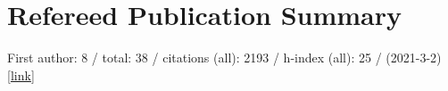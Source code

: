\section*{Refereed Publication Summary}

First author: 8 / total: 38 / citations (all): 2193 / h-index (all): 25 / (2021-3-2) [\href{https://ui.adsabs.harvard.edu/#/public-libraries/G0Ow9TGTRyuVT7hbhzailA}{link}]
